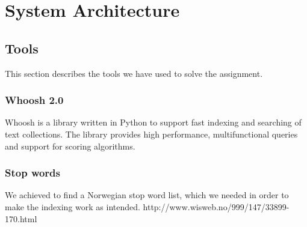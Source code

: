 \chapter{System Architecture}

\section{Tools}
This section describes the tools we have used to solve the assignment. 

\subsection{Whoosh 2.0}
Whoosh is a library written in Python to support fast indexing and searching of text collections. The library provides high performance, multifunctional queries and support for scoring algorithms.

\subsection{Stop words}
We achieved to find a Norwegian stop word list, which we needed in order to make the indexing work as intended.
http://www.wisweb.no/999/147/33899-170.html
